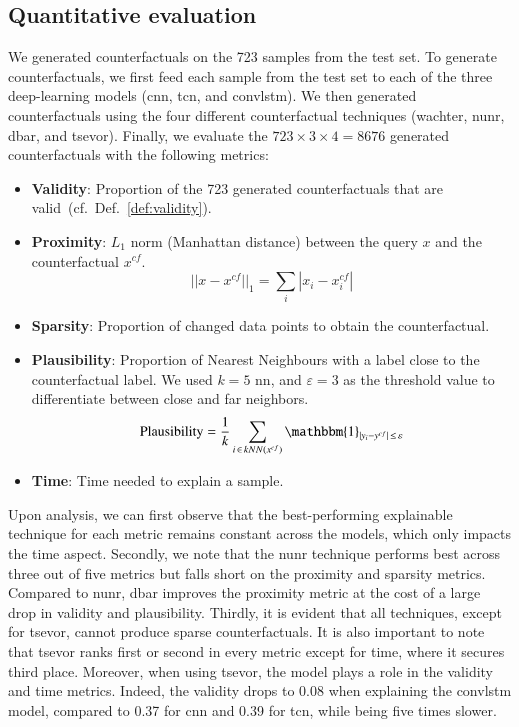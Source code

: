 \subsection{Quantitative evaluation}

We generated counterfactuals on the 723 samples from the test set. To generate counterfactuals, we first feed each sample from the test set to each of the three deep-learning models (\gls{cnn}, \gls{tcn}, and \gls{convlstm}). We then generated counterfactuals using the four different counterfactual techniques (\gls{wachter}, \gls{nunr}, \gls{dbar}, and \gls{tsevor}). Finally, we evaluate the $723\times3\times4=8676$ generated counterfactuals with the following metrics:
\begin{itemize}
    \item \textbf{Validity}: Proportion of the 723 generated counterfactuals that are valid~(cf.~Def.~\ref{def:validity}). 
    \item \textbf{Proximity}: $L_1$ norm (Manhattan distance) between the query $x$ and the counterfactual $x^{cf}$.
    \begin{equation}
        ||x - x^{cf}||_1 = \sum_i|x_i - x_i^{cf}|
    \end{equation}
    \item \textbf{Sparsity}: Proportion of changed data points to obtain the counterfactual. 
    \item \textbf{Plausibility}: Proportion of Nearest Neighbours with a label close to the counterfactual label. We used $k=5$ \gls{nn}, and $\varepsilon=3$ as the threshold value to differentiate between close and far neighbors.
    \begin{equation}        \text{Plausibility}=\frac{1}{k}\sum_{i\, \in\, kNN(x^{cf})}\mathbbm{1}_{|y_i - y^{cf}|\, \leq\, \varepsilon}
    \end{equation}
    \item \textbf{Time}: Time needed to explain a sample.
\end{itemize}

Upon analysis, we can first observe that the best-performing explainable technique for each metric remains constant across the models, which only impacts the time aspect. Secondly, we note that the \gls{nunr} technique performs best across three out of five metrics but falls short on the proximity and sparsity metrics. Compared to \gls{nunr}, \gls{dbar} improves the proximity metric at the cost of a large drop in validity and plausibility. Thirdly, it is evident that all techniques, except for \gls{tsevor}, cannot produce sparse counterfactuals. It is also important to note that \gls{tsevor} ranks first or second in every metric except for time, where it secures third place. Moreover, when using \gls{tsevor}, the model plays a role in the validity and time metrics. Indeed, the validity drops to 0.08 when explaining the \gls{convlstm} model, compared to 0.37 for \gls{cnn} and 0.39 for \gls{tcn}, while being five times slower.